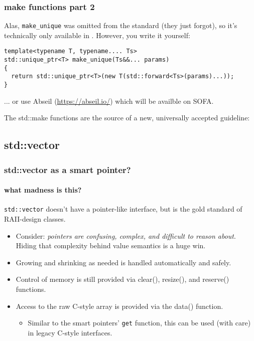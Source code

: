 \begin{frame}[fragile]
\frametitle{make functions part 2}

Alas, \texttt{make\_unique} was omitted from the  standard (they
just forgot), so it's technically only available in .  However,
you write it yourself:

{\scriptsize\begin{verbatim}
template<typename T, typename.... Ts>
std::unique_ptr<T> make_unique(Ts&&... params) 
{
  return std::unique_ptr<T>(new T(std::forward<Ts>(params)...));
}
\end{verbatim}}
\vskip 12pt
... or use Abseil (\url{https://abseil.io/}) which will be availble on SOFA.
\vskip 12pt

\begin{center}
The std::make functions are the source of a new, universally accepted  guideline: 
\vskip 6pt
\end{center}
\end{frame}




\subsection{std::vector}

\begin{frame}[fragile]
\frametitle{std::vector as a smart pointer?}
\framesubtitle{what madness is this?}

\texttt{std::vector} doesn't have a pointer-like interface, but is the
gold standard of RAII-design classes.

\begin{itemize}

\item Consider: \emph{pointers are confusing, complex, and difficult
  to reason about}.  Hiding that complexity behind value semantics is
  a huge win.

\item Growing and shrinking as needed is handled automatically and safely.

\item Control of memory is still provided via clear(), resize(), and
  reserve() functions.

\item Access to the raw C-style array is provided via the data()
  function.
\begin{itemize}
  \item Similar to the smart pointers' \texttt{get} function, this can
    be used (with care) in legacy C-style interfaces.
\end{itemize}
\end{itemize}

\end{frame}

